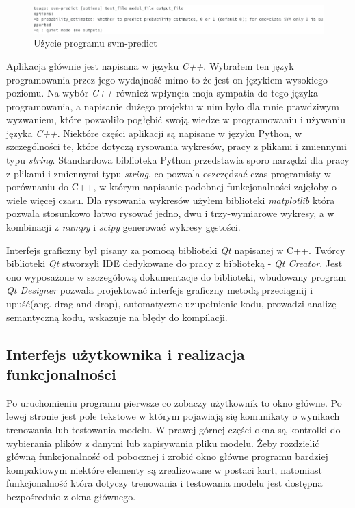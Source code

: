 \documentclass[paper=a4, fontsize=11pt]{scrartcl} %
\numberwithin{equation}{section} %
\numberwithin{figure}{section} %
\begin{document}
    \begin{figure}[h]
        \begin{center}
            \includegraphics[scale=0.6]{./img/svm_predict_usage.png}
            \caption{Użycie programu svm-predict}
            \label{fig:predict_usage}
        \end{center}
    \end{figure}

    \par Aplikacja głównie jest napisana w języku \textit{C++}. Wybrałem ten język
    programowania przez jego wydajność mimo to że jest on językiem wysokiego poziomu. Na wybór
    \textit{C++} również wpłynęła moja sympatia do tego języka programowania, a napisanie
    dużego projektu w nim było dla mnie prawdziwym wyzwaniem, które pozwoliło pogłębić swoją
    wiedze w programowaniu i używaniu języka \textit{C++}.  Niektóre części aplikacji są
    napisane w języku Python, w szczególności te, które dotyczą rysowania wykresów, pracy z
    plikami i zmiennymi typu \textit{string}. Standardowa biblioteka Python przedstawia sporo
    narzędzi dla pracy z plikami i zmiennymi typu \textit{string}, co pozwala oszczędzać czas
    programisty w porównaniu do C++, w którym napisanie podobnej funkcjonalności zajęłoby o
    wiele więcej czasu. Dla rysowania wykresów użyłem biblioteki \textit{matplotlib}
    \cite{matplotlib} która pozwala stosunkowo łatwo rysować jedno, dwu i trzy-wymiarowe
    wykresy, a w kombinacji z \textit{numpy} i \textit{scipy} generować wykresy gęstości.
    \par Interfejs graficzny był pisany za pomocą biblioteki \textit{Qt}
    \cite{qtlibrary} napisanej w C++.  Twórcy biblioteki \textit{Qt} stworzyli IDE dedykowane
    do pracy z biblioteką - \textit{Qt Creator}. Jest ono wyposażone w szczegółową dokumentacje
    do biblioteki, wbudowany program \textit{Qt Designer} pozwala projektować interfejs
    graficzny metodą przeciągnij i upuść(ang. drag and drop), automatyczne uzupełnienie kodu,
    prowadzi analizę semantyczną kodu, wskazuje na błędy do kompilacji.  

\subsection{Interfejs użytkownika i realizacja funkcjonalności}
    \par Po uruchomieniu programu pierwsze co zobaczy użytkownik to okno główne. Po lewej
    stronie jest pole tekstowe w którym pojawiają się komunikaty o wynikach trenowania lub
    testowania modelu. W prawej górnej części okna są kontrolki do wybierania plików z danymi
    lub zapisywania pliku modelu. Żeby rozdzielić główną funkcjonalność od pobocznej i zrobić
    okno główne programu bardziej kompaktowym niektóre elementy są zrealizowane w postaci kart,
    natomiast funkcjonalność która dotyczy trenowania i testowania modelu jest
    dostępna bezpośrednio z okna głównego.
\end{document}

